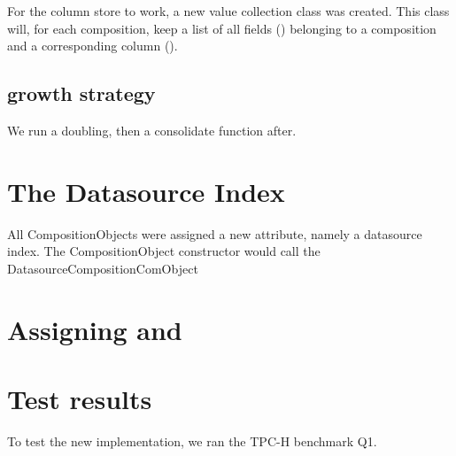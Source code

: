 For the column store to work, a new value collection class was created. This class will, for each composition, keep a list of all fields () belonging to a composition and a corresponding column ().

\subsection{ growth strategy}
\label{sub:FieldValueCollection growth strategy}
We run a doubling, then a consolidate function after.



\section{The Datasource Index}
\label{sec:The Datasource Index}
All CompositionObjects were assigned a new attribute, namely a datasource index. The CompositionObject constructor would call the DatasourceCompositionComObject



\section{Assigning and }
\label{sec:Assigning and }

\section{Test results}
\label{sec:Test results}
To test the new implementation, we ran the TPC-H benchmark Q1.


